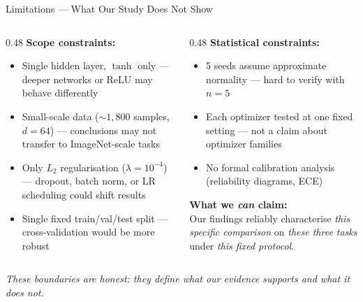 \documentclass[11pt,aspectratio=169]{beamer}
\begin{document}
\begin{frame}{Limitations --- What Our Study Does Not Show}

\begin{columns}[T]
\begin{column}{0.48\textwidth}
\textbf{Scope constraints:}
\begin{itemize}
    \item Single hidden layer, $\tanh$ only --- deeper networks or ReLU may behave differently
    \item Small-scale data (${\sim}1{,}800$ samples, $d{=}64$) --- conclusions may not transfer to ImageNet-scale tasks
    \item Only $L_2$ regularisation ($\lambda{=}10^{-4}$) --- dropout, batch norm, or LR scheduling could shift results
    \item Single fixed train/val/test split --- cross-validation would be more robust
\end{itemize}
\end{column}
\begin{column}{0.48\textwidth}
\textbf{Statistical constraints:}
\begin{itemize}
    \item 5 seeds assume approximate normality --- hard to verify with $n{=}5$
    \item Each optimizer tested at one fixed setting --- not a claim about optimizer families
    \item No formal calibration analysis (reliability diagrams, ECE)
\end{itemize}

\vspace{0.5em}
\textbf{What we \textit{can} claim:}\\
Our findings reliably characterise \textit{this specific comparison} on \textit{these three tasks} under \textit{this fixed protocol}.
\end{column}
\end{columns}

\vspace{0.3em}
\centering\small\textit{These boundaries are honest: they define what our evidence supports and what it does not.}

\end{frame}
\end{document}
